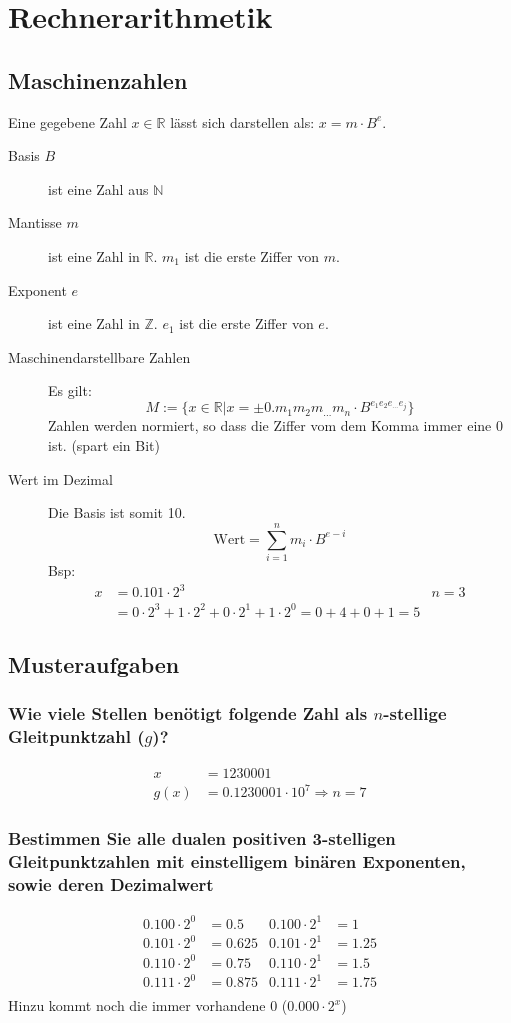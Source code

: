\section{Rechnerarithmetik}
\subsection{Maschinenzahlen}
Eine gegebene Zahl $x \in \mathbb{R}$ lässt sich darstellen als: $x = m \cdot B^e$.
\begin{description}
 \item [Basis $B$] ist eine Zahl aus $\mathbb{N}$
 \item [Mantisse $m$] ist eine Zahl in $\mathbb{R}$. $m_1$ ist die erste Ziffer von $m$.
 \item [Exponent $e$] ist eine Zahl in $\mathbb{Z}$. $e_1$ ist die erste Ziffer von $e$.
 \item [Maschinendarstellbare Zahlen] Es gilt:
 \begin{equation*}
  M:= \{x \in \mathbb{R} | x = \pm 0.m_1m_2m_{\dots}m_n \cdot B^{e_1e_2e_{\dots}e_j}\}
 \end{equation*}
 Zahlen werden normiert, so dass die Ziffer vom dem Komma immer eine $0$ ist. (spart ein Bit)
\item [Wert im Dezimal] Die Basis ist somit 10.
\begin{equation*}
 \mbox{Wert} = \sum_{i=1}^n m_i \cdot B^{e-i}
\end{equation*}
Bsp:
  \begin{align*}
   x& = 0.101 \cdot 2^3 & n = 3\\
    & = 0 \cdot 2^3 + 1 \cdot 2^2 + 0 \cdot 2^1 + 1 \cdot 2^0 = 0 + 4 + 0 + 1 = 5 
  \end{align*}
\end{description}

\subsection{Musteraufgaben}
\subsubsection{Wie viele Stellen benötigt folgende Zahl als $n$-stellige Gleitpunktzahl ($g$)?}
\begin{align*}
  x&= 1230001\\
  g(x)& = 0.1230001 \cdot 10^{7} \Rightarrow n = 7
\end{align*}
\subsubsection{Bestimmen Sie alle dualen positiven 3-stelligen Gleitpunktzahlen mit einstelligem binären Exponenten, sowie deren Dezimalwert}
\begin{align*}
  0.100 \cdot 2^0& = 0.5	& 0.100 \cdot 2^1& = 1\\
  0.101 \cdot 2^0& = 0.625	& 0.101 \cdot 2^1& = 1.25\\
  0.110 \cdot 2^0& = 0.75	& 0.110 \cdot 2^1& = 1.5\\
  0.111 \cdot 2^0& = 0.875	& 0.111 \cdot 2^1& = 1.75\\
\end{align*}
Hinzu kommt noch die immer vorhandene 0 ($0.000 \cdot 2^x$)
